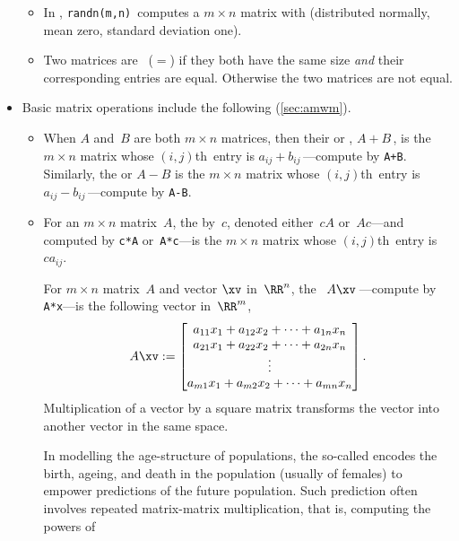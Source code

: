 \begin{itemize}
\begin{itemize}
\item In \script, \verb|randn(m,n)|~computes a \(m\times n\) matrix with  (distributed normally, mean zero, standard deviation one).

\item Two matrices are ~(\(=\)) if they both have the same size \emph{and} their corresponding entries are equal.
Otherwise the two matrices are not equal.

\end{itemize}


\item Basic matrix operations include the following (\cref{sec:amwm}).
\begin{itemize}
\item When \(A\) and~\(B\) are both \(m\times n\) matrices, then their  or , \(A+B\)\,, is the \(m\times n\) matrix whose \((i,j)\)th~entry is \(a_{ij}+b_{ij}\)\,---compute by \verb|A+B|.  
Similarly,  the  or  \(A-B\) is the \(m\times n\) matrix whose \((i,j)\)th~entry is \(a_{ij}-b_{ij}\)\,---compute by \verb|A-B|.

\item For an \(m\times n\) matrix~\(A\), the  by~\(c\), denoted either~\(cA\) or~\(Ac\)---and computed by \verb|c*A| or~\verb|A*c|---is the \(m\times n\) matrix whose \((i,j)\)th~entry is~\(ca_{ij}\).

\itemhi For \(m\times n\) matrix~\(A\) and vector \(\xv\) in~\(\RR^n\), the ~\(A\xv\)\,---compute by \verb|A*x|---is the following vector in~\(\RR^m\),
\begin{equation*}
A\xv:=
\begin{bmatrix} a_{11}x_1+a_{12}x_2+\cdots+a_{1n}x_n
\\a_{21}x_1+a_{22}x_2+\cdots+a_{2n}x_n
\\\vdots
\\a_{m1}x_1+a_{m2}x_2+\cdots+a_{mn}x_n
\end{bmatrix}.
\end{equation*}
Multiplication of a vector by a square matrix transforms the vector into another vector in the same space.

\itemme In modelling the age-structure of populations, the so-called  encodes the birth, ageing, and death in the population (usually of females) to empower predictions of the future population.
Such prediction often involves repeated matrix-matrix multiplication, that is, computing the powers of 


\end{itemize}
\end{itemize}
